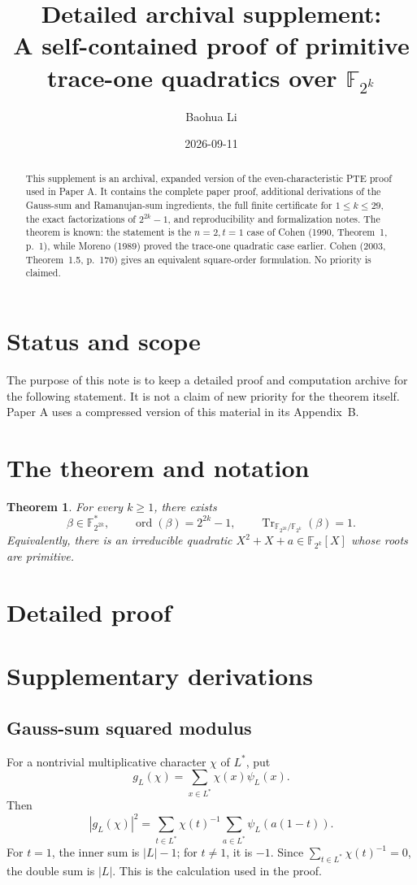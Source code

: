 \documentclass[11pt]{article}
\title{Detailed archival supplement:\\
A self-contained proof of primitive trace-one quadratics over \(\mathbb F_{2^k}\)}
\author{Baohua Li}
\date{2026-09-11}
\newtheorem{theorem}{Theorem}
\begin{document}
\maketitle
\begin{abstract}
This supplement is an archival, expanded version of the even-characteristic PTE proof used in Paper A. It contains the complete paper proof, additional derivations of the Gauss-sum and Ramanujan-sum ingredients, the full finite certificate for \(1\le k\le29\), the exact factorizations of \(2^{2k}-1\), and reproducibility and formalization notes. The theorem is known: the statement is the \(n=2,t=1\) case of Cohen (1990, Theorem~1, p.~1), while Moreno (1989) proved the trace-one quadratic case earlier. Cohen (2003, Theorem~1.5, p.~170) gives an equivalent square-order formulation. No priority is claimed.
\end{abstract}
\section{Status and scope}
The purpose of this note is to keep a detailed proof and computation archive for the following statement. It is not a claim of new priority for the theorem itself. Paper A uses a compressed version of this material in its Appendix~B.
\section{The theorem and notation}
\begin{theorem}\label{thm:pte}
For every \(k\ge1\), there exists
\[
\beta\in\mathbb F_{2^{2k}}^*,\qquad
\operatorname{ord}(\beta)=2^{2k}-1,\qquad
\operatorname{Tr}_{\mathbb F_{2^{2k}}/\mathbb F_{2^k}}(\beta)=1.
\]
Equivalently, there is an irreducible quadratic \(X^2+X+a\in\mathbb F_{2^k}[X]\) whose roots are primitive.
\end{theorem}
\section{Detailed proof}

\section{Supplementary derivations}
\subsection{Gauss-sum squared modulus}
For a nontrivial multiplicative character \(\chi\) of \(L^*\), put
\[
g_L(\chi)=\sum_{x\in L^*}\chi(x)\psi_L(x).
\]
Then
\[
|g_L(\chi)|^2
=\sum_{t\in L^*}\chi(t)^{-1}\sum_{a\in L^*}\psi_L(a(1-t)).
\]
For \(t=1\), the inner sum is \(|L|-1\); for \(t\ne1\), it is \(-1\). Since \(\sum_{t\in L^*}\chi(t)^{-1}=0\), the double sum is \(|L|\). This is the calculation used in the proof.
\end{document}
